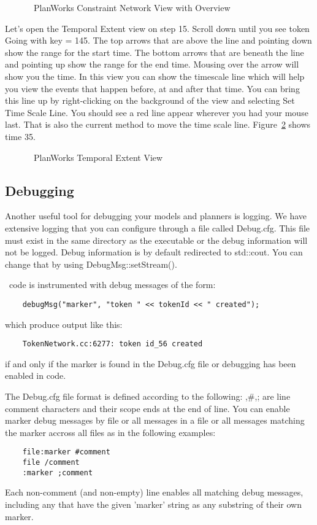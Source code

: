 \documentclass[10pt, letterpaper, twoside]{article}
\begin{document}
\begin{figure}[h]
\centering{}
\caption{\ET\, PlanWorks Constraint Network View with Overview}
\label{ConstraintNetworkOverview}
\end{figure}

Let's open the Temporal Extent view on step 15.  Scroll down until you
see token Going with key = 145.  The top arrows that are above the line and
pointing down show the range for the start time.  The bottom arrows that
are beneath the line and pointing up show the range for the end time.
Mousing over the arrow will show you the time.  In this view you can show
the timescale line which will help you view the events that happen before,
at and after that time.  You can bring this line up by right-clicking on
the background of the view and selecting Set Time Scale Line.  You should
see a red line appear wherever you had your mouse last.  That is also the
current method to move the time scale line. Figure~\ref{TemporalExtentView}
shows time 35.  
\begin{figure}[h]
\centering{}
\caption{\ET\, PlanWorks Temporal Extent View}
\label{TemporalExtentView}
\end{figure}

\subsection{Debugging}

Another useful tool for debugging your models and planners is logging. We
have extensive logging that you can configure through a file called
Debug.cfg.  This file must exist in the same directory as the executable or
the debug information will not be logged.  Debug information is by default
redirected to std::cout. You can change that by using
DebugMsg::setStream().
 
\ET\, code is instrumented with debug messages of the form:
\begin{verbatim}
	debugMsg("marker", "token " << tokenId << " created");
\end{verbatim}
which produce output like this:
\begin{verbatim}
	TokenNetwork.cc:6277: token id_56 created
\end{verbatim}
if and only if the marker is found in the Debug.cfg file or debugging has
been enabled in code. 

The Debug.cfg file format is defined according to the following: \/,\#,;
are line comment characters and their scope ends at the end of line. You
can enable marker debug messages by file or all messages in a file or all
messages matching the marker accross all files as in the following
examples:
\begin{verbatim}
	file:marker #comment
	file /comment
	:marker ;comment
\end{verbatim}
Each non-comment (and non-empty) line enables all matching debug
messages, including any that have the given 'marker' string as any
substring of their own marker.
\end{document}
